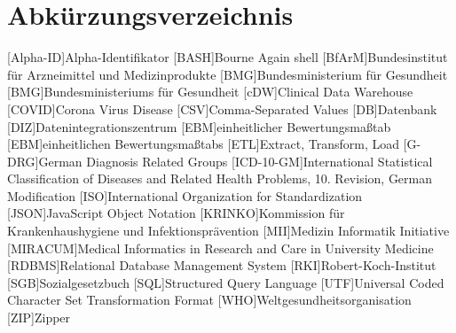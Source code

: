 \chapter*{Abkürzungsverzeichnis}
\setcounter{page}{4}
\begin{acronym}[ICD-10-GM]
	[Alpha-ID]{Alpha-Identifikator}
	[BASH]{Bourne Again shell}		
	[BfArM]{Bundesinstitut für Arzneimittel und Medizinprodukte}
	[BMG]{Bundesministerium für Gesundheit}	
	[BMG]{Bundesministeriums für Gesundheit}
	[cDW]{Clinical Data Warehouse}
	[COVID]{Corona Virus Disease}	
	[CSV]{Comma-Separated Values}	
	[DB]{Datenbank}
	[DIZ]{Datenintegrationszentrum}	
	[EBM]{einheitlicher Bewertungsmaßtab}
	[EBM]{einheitlichen Bewertungsmaßtabs}
	[ETL]{Extract, Transform, Load}
	[G-DRG]{German Diagnosis Related Groups}	
	[ICD-10-GM]{International Statistical Classification of Diseases and Related Health Problems, 10. Revision, German Modification}	
	[ISO]{International Organization for Standardization}
	[JSON]{JavaScript Object Notation}
	[KRINKO]{Kommission für Krankenhaushygiene und Infektionsprävention}	
	[MII]{Medizin Informatik Initiative}
	[MIRACUM]{Medical Informatics in Research and Care in University Medicine}
	[RDBMS]{Relational Database Management System}	
	[RKI]{Robert-Koch-Institut}
	[SGB]{Sozialgesetzbuch}
	[SQL]{Structured Query Language}
	[UTF]{Universal Coded Character Set Transformation Format}
	[WHO]{Weltgesundheitsorganisation}
	[ZIP]{Zipper}
\end{acronym}

